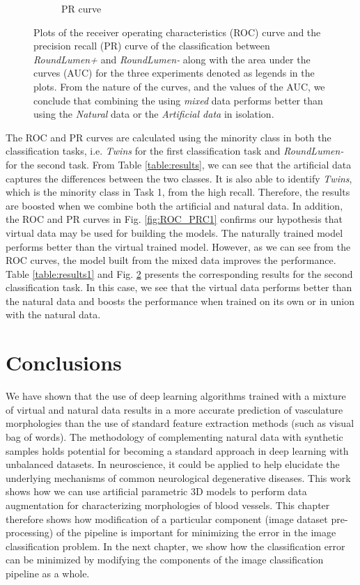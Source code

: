 \begin{figure}[ht!]
\begin{subfigure}[t]{0.5\textwidth}
  \caption{PR curve }
        \label{fig:PRC2}
    \end{subfigure}%
    \caption{Plots of the receiver operating characteristics (ROC) curve and the precision recall (PR) curve of the classification between \textit{RoundLumen+} and \textit{RoundLumen-} along with the area under the curves (AUC) for the three experiments denoted as legends in the plots. From the nature of the curves, and the values of the AUC, we conclude that combining the using \textit{mixed} data performs better than using the \textit{Natural} data or the \textit{Artificial data} in isolation.}
    \label{fig:ROC_PRC2}
\end{figure}

The ROC and PR curves are calculated using the minority class in both the classification tasks, i.e. \textit{Twins} for the first classification task and \textit{RoundLumen-} for the second task.
From Table \ref{table:results}, we can see that the artificial data captures the differences between the two classes. It is also able to identify \textit{Twins}, which is the minority class in Task 1, from the high recall. Therefore, the results are boosted when we combine both the artificial and natural data. In addition, the ROC and PR curves in Fig. \ref{fig:ROC_PRC1} confirms our hypothesis that virtual data may be used for building the models. The naturally trained model performs better than the virtual trained model. However, as we can see from the ROC curves, the model built from the mixed data improves the performance. Table \ref{table:results1} and Fig.  \ref{fig:ROC_PRC2} presents the corresponding results for the second classification task. In this case, we see that the virtual data performs better than the natural data and boosts the performance when trained on its own or in union with the natural data.

\section{Conclusions}
We have shown that the use of deep learning algorithms  trained with a mixture of virtual and natural data  results in a more accurate prediction of vasculature morphologies than the use of standard feature extraction methods (such as visual bag of words). The methodology of complementing natural data with synthetic samples holds potential for becoming a standard approach in deep learning with unbalanced datasets. In neuroscience, it could be applied to help elucidate the underlying mechanisms of common neurological degenerative diseases.
This work shows how we can use artificial parametric 3D models to perform data augmentation for characterizing morphologies of blood vessels. This chapter therefore shows how modification of a particular component (image dataset pre-processing) of the  pipeline is important for minimizing the error in the image classification problem. In the next chapter, we show how the classification error can be minimized by modifying the components of the image classification pipeline as a whole.